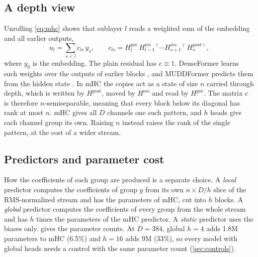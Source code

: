 \documentclass[11pt, a4paper]{article}
\newcommand{\Hpre}{H^{\mathrm{pre}}}
\newcommand{\Hpost}{H^{\mathrm{post}}}
\newcommand{\Hres}{H^{\mathrm{res}}}
\begin{document}
\subsection{A depth view}
\label{sec:depth}

Unrolling \cref{eq:mhc} shows that sublayer $l$ reads a weighted sum of the embedding and all earlier outputs,
\begin{equation}
  u_l = \sum_{s < l} c_{ls}\, y_s, \qquad
  c_{ls} = \Hpre_l\, \Hres_{l-1}{}^{\top} \cdots \Hres_{s+1}{}^{\top}\, \Hpost_s{}^{\top},
  \label{eq:depth}
\end{equation}
where $y_0$ is the embedding. The plain residual has $c \equiv 1$. DenseFormer learns such weights over the outputs of earlier blocks
\citep{pagliardini2024denseformer}, and MUDDFormer predicts them from the hidden state \citep{xiao2025muddformer}. In mHC the copies
act as a state of size $n$ carried through depth, which is written by $\Hpost$, moved by $\Hres$ and read by $\Hpre$. The matrix
$c$ is therefore $n$-semiseparable, meaning that every block below its diagonal has rank at most $n$. mHC gives all $D$ channels
one such pattern, and $h$ heads give each channel group its own. Raising $n$ instead raises the rank of the single pattern, at the
cost of a wider stream.

\subsection{Predictors and parameter cost}
\label{sec:predictors}

How the coefficients of each group are produced is a separate choice. A \emph{local} predictor computes the coefficients of group
$g$ from its own $n \times D/h$ slice of the RMS-normalized stream and has the parameters of mHC, cut into $h$ blocks. A \emph{global} predictor
computes the coefficients of every group from the whole stream and has $h$ times the parameters of the mHC predictor. A
\emph{static} predictor uses the biases only.  gives the parameter counts. At $D = 384$, global $h = 4$ adds 1.8M
parameters to mHC (6.5\%) and $h = 16$ adds 9M (33\%), so every model with global heads needs a control with the same parameter
count (\cref{sec:controls}).
\end{document}
